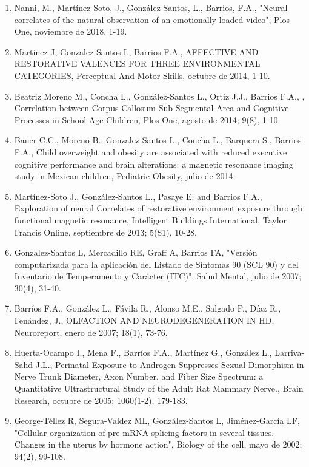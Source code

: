 \begin{enumerate}
\item Nanni, M., Martínez-Soto, J., González-Santos, L., Barrios, F.A., "Neural correlates of the natural observation of an emotionally loaded video", Plos 
One, 
noviembre de 2018, 1-19.

\item Martinez J, Gonzalez-Santos L, Barrios F.A., AFFECTIVE AND RESTORATIVE VALENCES FOR THREE ENVIRONMENTAL CATEGORIES, Perceptual And Motor Skills, 
octubre de 
2014, 1-10.

\item Beatriz Moreno M., Concha L., González-Santos L., Ortiz J.J., Barrios F.A., , Correlation between Corpus Callosum Sub-Segmental Area and Cognitive 
Processes 
in School-Age Children, Plos One, agosto de 2014; 9(8), 1-10.

\item Bauer C.C., Moreno B., Gonzalez-Santos L., Concha L., Barquera S., Barrios F.A., Child overweight and obesity are associated with reduced executive 
cognitive performance and brain alterations: a magnetic resonance imaging study in Mexican children, Pediatric Obesity, julio de 2014.

\item Martínez-Soto J., González-Santos L., Pasaye E. and Barrios F.A., Exploration of neural Correlates of restorative environment exposure through 
functional 
magnetic resonance, Intelligent Buildings International, Taylor Francis Online, septiembre de 2013; 5(S1), 10-28.

\item Gonzalez-Santos L, Mercadillo RE, Graff A, Barrios FA, "Versión computarizada para la aplicación del Listado de Síntomas 90 (SCL 90) y del Inventario 
de 
Temperamento y Carácter (ITC)", Salud Mental, julio de 2007; 30(4), 31-40.

\item Barríos F.A., González L., Fávila R., Alonso M.E., Salgado P., Díaz R., Fenández, J., OLFACTION AND NEURODEGENERATION IN HD, Neuroreport, enero de 
2007; 
18(1), 73-76.

\item Huerta-Ocampo I., Mena F., Barríos F.A., Martínez G., González L., Larriva-Sahd J.L., Perinatal Exposure to Androgen Suppresses Sexual Dimorphism in 
Nerve 
Trunk Diameter, Axon Number, and Fiber Size Spectrum: a Quantitative Ultrastructural Study of the Adult Rat Mammary Nerve., Brain Research, octubre de 2005; 
1060(1-2), 179-183.

\item George-Téllez R, Segura-Valdez ML, González-Santos L, Jiménez-García LF, "Cellular organization of pre-mRNA splicing factors in several tissues. 
Changes in 
the uterus by hormone action", Biology of the cell, mayo de 2002; 94(2), 99-108.


\end{enumerate}
